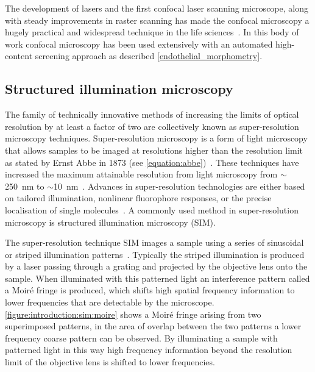 The development of lasers and the first confocal laser scanning microscope,  along with steady improvements in raster scanning has made the confocal microscopy a hugely practical and widespread technique in the life sciences~\cite{Sheppard1977}. In this body of work confocal microscopy has been used extensively with an automated high-content screening approach as described \autoref{endothelial_morphometry}.

\subsection{Structured illumination microscopy}
\label{introduction:microscopy:structured_illumination_microscopy}
The family of technically innovative methods of increasing the limits of optical resolution by at least a factor of two are collectively known as super-resolution microscopy techniques. Super-resolution microscopy is a form of light microscopy that allows samples to be imaged at resolutions higher than the resolution limit as stated by Ernst Abbe in 1873 (see \autoref{equation:abbe})~\cite{Abbe1873}. These techniques have increased the maximum attainable resolution from light microscopy from $\sim$\SI{250}{\nano\meter} to $\sim$\SI{10}{\nano\meter}~\cite{Galbraith2011}. Advances in super-resolution technologies are either based on tailored illumination, nonlinear fluorophore responses, or the precise localisation of single molecules~\cite{Schermelleh2010}. A commonly used method in super-resolution microscopy is structured illumination microscopy (SIM).

The super-resolution technique SIM images a sample using a series of sinusoidal or striped illumination patterns~\cite{Gustafsson2000}. Typically the striped illumination is produced by a laser passing through a grating and projected by the objective lens onto the sample. When illuminated with this patterned light an interference pattern called a Moir\'e fringe is produced, which shifts high spatial frequency information to lower frequencies that are detectable by the microscope. \autoref{figure:introduction:sim:moire} shows a Moir\'e fringe arising from two superimposed patterns, in the area of overlap between the two patterns a lower frequency coarse pattern can be observed. By illuminating a sample with patterned light in this way high frequency information beyond the resolution limit of the objective lens is shifted to lower frequencies.

